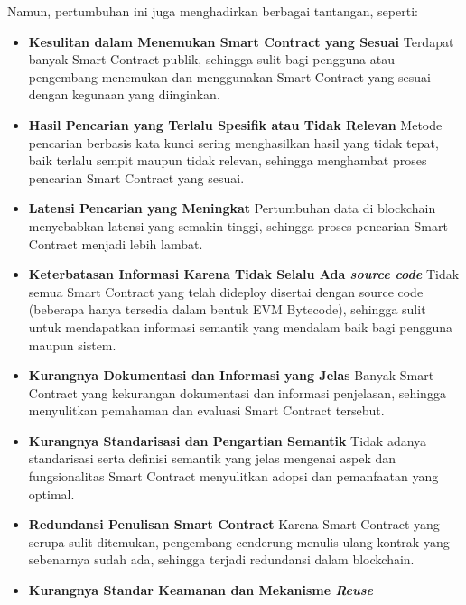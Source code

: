 Namun, pertumbuhan ini juga menghadirkan berbagai tantangan, seperti:
\begin{itemize}
	\item \textbf{Kesulitan dalam Menemukan Smart Contract yang Sesuai} \newline
	      Terdapat banyak Smart Contract publik, sehingga sulit bagi pengguna atau pengembang menemukan dan menggunakan Smart Contract yang sesuai dengan kegunaan yang diinginkan.
	\item \textbf{Hasil Pencarian yang Terlalu Spesifik atau Tidak Relevan} \newline
	      Metode pencarian berbasis kata kunci sering menghasilkan hasil yang tidak tepat, baik terlalu sempit maupun tidak relevan, sehingga menghambat proses pencarian Smart Contract yang sesuai.
	\item \textbf{Latensi Pencarian yang Meningkat} \newline
	      Pertumbuhan data di blockchain menyebabkan latensi yang semakin tinggi, sehingga proses pencarian Smart Contract menjadi lebih lambat.
	\item \textbf{Keterbatasan Informasi Karena Tidak Selalu Ada \textit{source code}} \newline
	      Tidak semua Smart Contract yang telah dideploy disertai dengan source code (beberapa hanya tersedia dalam bentuk EVM Bytecode), sehingga sulit untuk mendapatkan informasi semantik yang mendalam baik bagi pengguna maupun sistem.
	\item \textbf{Kurangnya Dokumentasi dan Informasi yang Jelas} \newline
	      Banyak Smart Contract yang kekurangan dokumentasi dan informasi penjelasan, sehingga menyulitkan pemahaman dan evaluasi Smart Contract tersebut.
	\item \textbf{Kurangnya Standarisasi dan Pengartian Semantik} \newline
	      Tidak adanya standarisasi serta definisi semantik yang jelas mengenai aspek dan fungsionalitas Smart Contract menyulitkan adopsi dan pemanfaatan yang optimal.
	\item \textbf{Redundansi Penulisan Smart Contract} \newline
	      Karena Smart Contract yang serupa sulit ditemukan, pengembang cenderung menulis ulang kontrak yang sebenarnya sudah ada, sehingga terjadi redundansi dalam blockchain.
	\item \textbf{Kurangnya Standar Keamanan dan Mekanisme \textit{Reuse}} \newline

\end{itemize}
